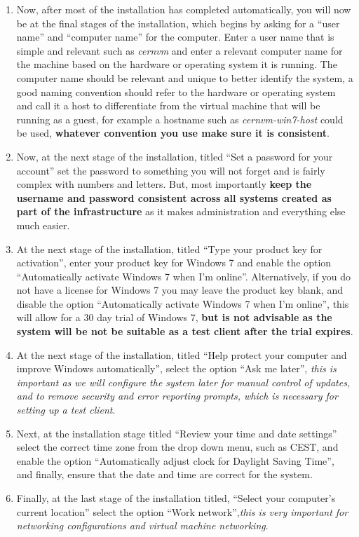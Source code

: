 \begin{enumerate}
\item	Now, after most of the installation has completed automatically, you will now be at the final stages of the installation,
		which begins by asking for a ``user name'' and ``computer name'' for the computer. Enter a user name that is simple
		and relevant such as \emph{cernvm} and enter a relevant computer name for the machine based on the hardware or operating system 
		it is running. The computer name should be relevant and unique to better identify the system, a good naming convention should refer
		to the hardware or operating system and call it a host to differentiate from the virtual machine that will be running as a guest, 
		for example a hostname such as \emph{cernvm-win7-host} could be used, {\bf whatever convention you use make sure it is consistent}.

\item	Now, at the next stage of the installation, titled ``Set a password for your account'' set the password to something
		you will not forget and is fairly complex with numbers and letters. But, most importantly {\bf keep the username and password 
		consistent across all systems created as part of the infrastructure} as it makes administration and everything else 
		much easier.
	  
\item	At the next stage of the installation, titled ``Type your product key for activation'', enter your product key for Windows 7
		and enable the option ``Automatically activate Windows 7 when I'm online''. Alternatively, if you do not have a license for
		Windows 7 you may leave the product key blank, and disable the option ``Automatically activate Windows 7 when I'm online'',
		this will allow for a 30 day trial of Windows 7, {\bf but is not advisable as the system will be not be suitable as a 
		test client after the trial expires}.
		
\item	At the next stage of the installation, titled ``Help protect your computer and improve Windows automatically'', select the option
		``Ask me later'', \emph{this is important as we will configure the system later for manual control of updates, and to remove
		security and error reporting prompts, which is necessary for setting up a test client}.
		 
\item	Next, at the installation stage titled ``Review your time and date settings'' select the correct time zone from the drop down menu,
		such as CEST, and enable the option ``Automatically adjust clock for Daylight Saving Time'', and finally, ensure that the date
		and time are correct for the system.
		

\item	Finally, at the last stage of the installation titled, ``Select your computer's current location'' select the option ``Work 
		network'',\emph{this is very important for networking configurations and virtual machine networking}.
\end{enumerate}


